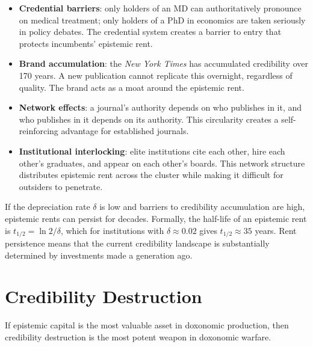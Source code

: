 \begin{example}
\label{ex:rent-sources}
\begin{itemize}[nosep]
  \item \textbf{Credential barriers}: only holders of an MD can authoritatively pronounce on medical treatment; only holders of a PhD in economics are taken seriously in policy debates.
  The credential system creates a barrier to entry that protects incumbents' epistemic rent.
  \item \textbf{Brand accumulation}: the \textit{New York Times} has accumulated credibility over 170 years.
  A new publication cannot replicate this overnight, regardless of quality.
  The brand acts as a moat around the epistemic rent.
  \item \textbf{Network effects}: a journal's authority depends on who publishes in it, and who publishes in it depends on its authority.
  This circularity creates a self-reinforcing advantage for established journals.
  \item \textbf{Institutional interlocking}: elite institutions cite each other, hire each other's graduates, and appear on each other's boards.
  This network structure distributes epistemic rent across the cluster while making it difficult for outsiders to penetrate.
\end{itemize}
\end{example}

\begin{proposition}
\label{prop:rent-persistence}
If the depreciation rate $\delta$ is low and barriers to credibility accumulation are high, epistemic rents can persist for decades.
Formally, the half-life of an epistemic rent is $t_{1/2} = \ln 2 / \delta$, which for institutions with $\delta \approx 0.02$ gives $t_{1/2} \approx 35$ years.
Rent persistence means that the current credibility landscape is substantially determined by investments made a generation ago.
\end{proposition}


\section{Credibility Destruction}
\label{sec:ch6-destruction}

If epistemic capital is the most valuable asset in doxonomic production, then credibility destruction is the most potent weapon in doxonomic warfare.

